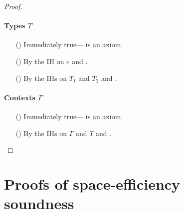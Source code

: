 \documentclass[9pt]{extarticle}
\newcommand{\ottnt}[1]{\mathit{#1}}
\begin{document}
\begin{lemma}
\begin{proof}
{    \paragraph{Types $\ottnt{T}$}
    \begin{itemize}
    \item[(\WF{Base})] Immediately true--- is an axiom.
    \item[(\WF{Refine})] By the IH on $\ottnt{e}$ and .
    \item[(\WF{Fun})] By the IHs on $\ottnt{T_{{\mathrm{1}}}}$ and $\ottnt{T_{{\mathrm{2}}}}$ and .
    \end{itemize}

    \paragraph{Contexts $\Gamma$}
    \begin{itemize}
    \item[(\WF{Empty})] Immediately true--- is an axiom.
    \item[(\WF{Extend})] By the IHs on $\Gamma$ and $\ottnt{T}$ and
      .
    \end{itemize}
    \fi}
  \end{proof}
\end{lemma}

\section{Proofs of space-efficiency soundness}
\label{app:sesoundness}
\end{document}
